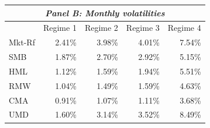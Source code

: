 \begin{tabular*}{\textwidth}{l@{\extracolsep{\fill}}rrrr}
\multicolumn{5}{c}{\textit{Panel B: Monthly volatilities}} \\
\midrule
 & Regime 1 & Regime 2 & Regime 3 & Regime 4 \\
\midrule
Mkt-Rf & 2.41\% & 3.98\% & 4.01\% & 7.54\% \\
SMB & 1.87\% & 2.70\% & 2.92\% & 5.15\% \\
HML & 1.12\% & 1.59\% & 1.94\% & 5.51\% \\
RMW & 1.04\% & 1.49\% & 1.59\% & 4.63\% \\
CMA & 0.91\% & 1.07\% & 1.11\% & 3.68\% \\
UMD & 1.60\% & 3.14\% & 3.52\% & 8.49\% \\
\midrule[\heavyrulewidth]
\end{tabular*}
